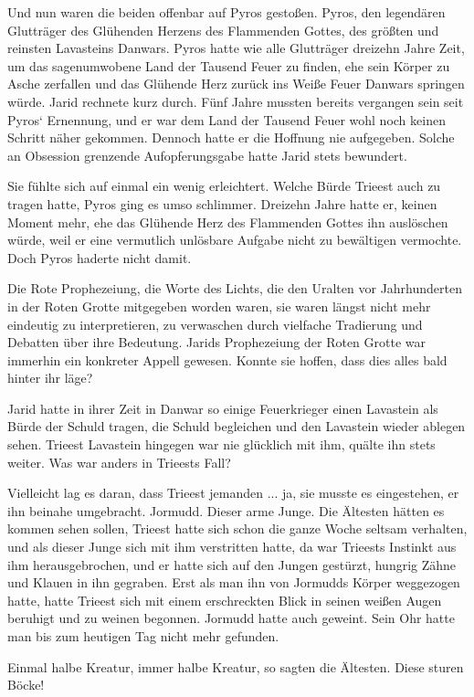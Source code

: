 Und nun waren die beiden offenbar auf Pyros gestoßen. Pyros, den legendären Glutträger des Glühenden Herzens des Flammenden Gottes, des größten und reinsten Lavasteins Danwars. Pyros hatte wie alle Glutträger dreizehn Jahre Zeit, um das sagenumwobene Land der Tausend Feuer zu finden, ehe sein Körper zu Asche zerfallen und das Glühende Herz zurück ins Weiße Feuer Danwars springen würde. Jarid rechnete kurz durch. Fünf Jahre mussten bereits vergangen sein seit Pyros‘ Ernennung, und er war dem Land der Tausend Feuer wohl noch keinen Schritt näher gekommen. Dennoch hatte er die Hoffnung nie aufgegeben. Solche an Obsession grenzende Aufopferungsgabe hatte Jarid stets bewundert.

Sie fühlte sich auf einmal ein wenig erleichtert. Welche Bürde Trieest auch zu tragen hatte, Pyros ging es umso schlimmer. Dreizehn Jahre hatte er, keinen Moment mehr, ehe das Glühende Herz des Flammenden Gottes ihn auslöschen würde, weil er eine vermutlich unlösbare Aufgabe nicht zu bewältigen vermochte. Doch Pyros haderte nicht damit.

Die Rote Prophezeiung, die Worte des Lichts, die den Uralten vor Jahrhunderten in der Roten Grotte mitgegeben worden waren, sie waren längst nicht mehr eindeutig zu interpretieren, zu verwaschen durch vielfache Tradierung und Debatten über ihre Bedeutung. Jarids Prophezeiung der Roten Grotte war immerhin ein konkreter Appell gewesen. Konnte sie hoffen, dass dies alles bald hinter ihr läge?

Jarid hatte in ihrer Zeit in Danwar so einige Feuerkrieger einen Lavastein als Bürde der Schuld tragen, die Schuld begleichen und den Lavastein wieder ablegen sehen. Trieest Lavastein hingegen war nie glücklich mit ihm, quälte ihn stets weiter. Was war anders in Trieests Fall?

Vielleicht lag es daran, dass Trieest jemanden ... ja, sie musste es eingestehen, er ihn beinahe umgebracht. Jormudd. Dieser arme Junge. Die Ältesten hätten es kommen sehen sollen, Trieest hatte sich schon die ganze Woche seltsam verhalten, und als dieser Junge sich mit ihm verstritten hatte, da war Trieests Instinkt aus ihm herausgebrochen, und er hatte sich auf den Jungen gestürzt, hungrig Zähne und Klauen in ihn gegraben. Erst als man ihn von Jormudds Körper weggezogen hatte, hatte Trieest sich mit einem erschreckten Blick in seinen weißen Augen beruhigt und zu weinen begonnen. Jormudd hatte auch geweint. Sein Ohr hatte man bis zum heutigen Tag nicht mehr gefunden.

Einmal halbe Kreatur, immer halbe Kreatur, so sagten die Ältesten. Diese sturen Böcke!

